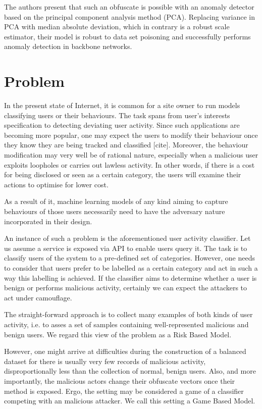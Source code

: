 \documentclass[10pt]{article}
\begin{document}
The authors present that such an obfuscate is possible with an anomaly
detector based on the principal component analysis method (PCA).
Replacing variance in PCA with median absolute deviation, which in
contrary is a robust scale estimator, their model is robust to data set
poisoning and successfully performs anomaly detection in backbone
networks.

\section{Problem}

In the present state of Internet, it is common for a site owner to run
models classifying users or their behaviours. The task spans from user’s
interests specification to detecting deviating user activity. Since such
applications are becoming more popular, one may expect the users to
modify their behaviour once they know they are being tracked and
classified {[}cite{]}. Moreover, the behaviour modification may very
well be of rational nature, especially when a malicious user exploits
loopholes or carries out lawless activity. In other words, if there is a
cost for being disclosed or seen as a certain category, the users will
examine their actions to optimise for lower cost.

As a result of it, machine learning models of any kind aiming to capture
behaviours of those users necessarily need to have the adversary nature
incorporated in their design.

An instance of such a problem is the aforementioned user activity
classifier. Let us assume a service is exposed via API to enable users
query it. The task is to classify users of the system to a pre-defined
set of categories. However, one needs to consider that users prefer to
be labelled as a certain category and act in such a way this labelling
is achieved. If the classifier aims to determine whether a user is
benign or performs malicious activity, certainly we can expect the
attackers to act under camouflage.

The straight-forward approach is to collect many examples of both kinds
of user activity, i.e. to asses a set of samples containing
well-represented malicious and benign users. We regard this view of the
problem as a Risk Based Model.

However, one might arrive at difficulties during the construction of a
balanced dataset for there is usually very few records of malicious
activity, disproportionally less than the collection of normal, benign
users. Also, and more importantly, the malicious actors change their
obfuscate vectors once their method is exposed. Ergo, the setting may be
considered a game of a classifier competing with an malicious attacker.
We call this setting a Game Based Model.
\end{document}

